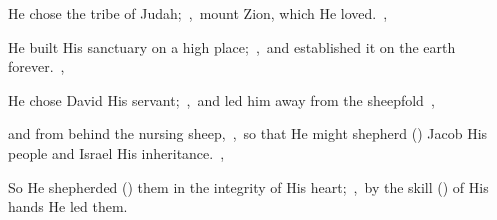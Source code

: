 \documentclass[12pt,twoside,a5paper]{article}
\begin{document}
\begin{halfparskip}
  He chose the tribe of Judah;~\sep\ mount Zion, which He loved.~\sep

  He built His sanctuary on a high place;~\sep\ and established it on the earth forever.~\sep

  He chose David His servant;~\sep\ and led him away from the sheepfold~\sep

  and from behind the nursing sheep,~\sep\ so that He might shepherd () Jacob His people and Israel His inheritance.~\sep

  So He shepherded () them in the integrity of His heart;~\sep\ by the skill () of His hands He led them.
\end{halfparskip}

\end{document}
